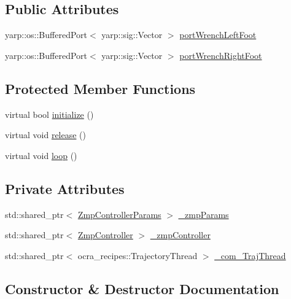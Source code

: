 \subsection*{Public Attributes}
\begin{DoxyCompactItemize}
\item 
yarp\+::os\+::\+Buffered\+Port$<$ yarp\+::sig\+::\+Vector $>$ \hyperlink{classWalkingClient_a88ee63ff6a341eccd458d24700383457}{port\+Wrench\+Left\+Foot}
\item 
yarp\+::os\+::\+Buffered\+Port$<$ yarp\+::sig\+::\+Vector $>$ \hyperlink{classWalkingClient_a96321dc60e84c193f2dea6e85983ca67}{port\+Wrench\+Right\+Foot}
\end{DoxyCompactItemize}
\subsection*{Protected Member Functions}
\begin{DoxyCompactItemize}
\item 
virtual bool \hyperlink{classWalkingClient_aba6a03fe29a4e947bc6bc0c09a713b2a}{initialize} ()
\item 
virtual void \hyperlink{classWalkingClient_a3b36da9d7649865a13c9318dd73ebc7e}{release} ()
\item 
virtual void \hyperlink{classWalkingClient_afd997bb00534c57fe1b0d5f37f207386}{loop} ()
\end{DoxyCompactItemize}
\subsection*{Private Attributes}
\begin{DoxyCompactItemize}
\item 
std\+::shared\+\_\+ptr$<$ \hyperlink{structZmpControllerParams}{Zmp\+Controller\+Params} $>$ \hyperlink{classWalkingClient_a20012b4bee7f6de8177ed53907f894cb}{\+\_\+zmp\+Params}
\item 
std\+::shared\+\_\+ptr$<$ \hyperlink{classZmpController}{Zmp\+Controller} $>$ \hyperlink{classWalkingClient_afc6a0ac97a4c3f83e27879e803fab8f6}{\+\_\+zmp\+Controller}
\item 
std\+::shared\+\_\+ptr$<$ ocra\+\_\+recipes\+::\+Trajectory\+Thread $>$ \hyperlink{classWalkingClient_af1d2fec39a0545daf5d5e3681b4b2f17}{\+\_\+com\+\_\+\+Traj\+Thread}
\end{DoxyCompactItemize}


\subsection{Constructor \& Destructor Documentation}
\hypertarget{classWalkingClient_a6c9002a44a54814c4b482739824e39aa}{}\label{classWalkingClient_a6c9002a44a54814c4b482739824e39aa} 
